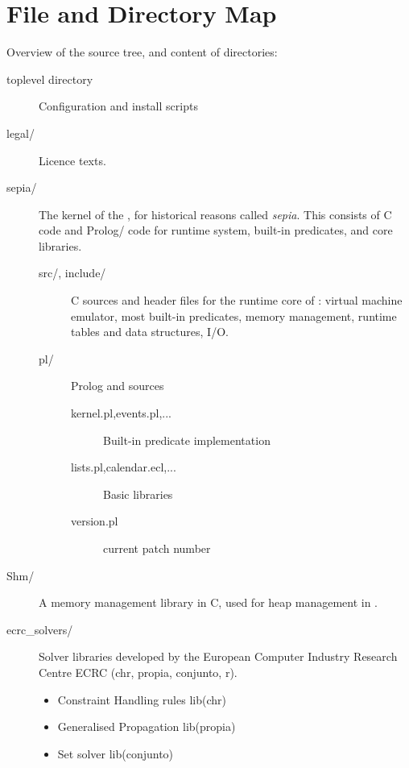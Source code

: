 \documentclass[11pt,a4paper]{book}
\begin{document}
\chapter{File and Directory Map}
Overview of the source tree, and content of directories:
\begin{description}
\item[toplevel directory] Configuration and install scripts
\item[legal/] Licence texts.

\item[sepia/] The kernel of the {\eclipse}, for historical reasons called {\em sepia}.
	This consists of C code and Prolog/{\eclipse} code for runtime
	system, built-in predicates, and core libraries.
    \begin{description}
    \item[src/, include/] C sources and header files for the runtime
    	core of {\eclipse}: virtual machine emulator, most built-in predicates,
	memory management, runtime tables and data structures, I/O.
    \item[pl/] Prolog and {\eclipse} sources
	\begin{description}
	\item[kernel.pl,events.pl,...] Built-in predicate implementation
	\item[lists.pl,calendar.ecl,...] Basic libraries
	\item[version.pl] current patch number
	\end{description}
    \end{description}

\item[Shm/] A memory management library in C, used for heap management in
	{\eclipse}.

\item[ecrc_solvers/] Solver libraries developed by the European Computer
	Industry Research Centre ECRC (chr, propia, conjunto, r).
    \begin{itemize}
    \item Constraint Handling rules lib(chr)
    \item Generalised Propagation lib(propia)
    \item Set solver lib(conjunto)
    \end{itemize}


\end{description}
\end{document}
